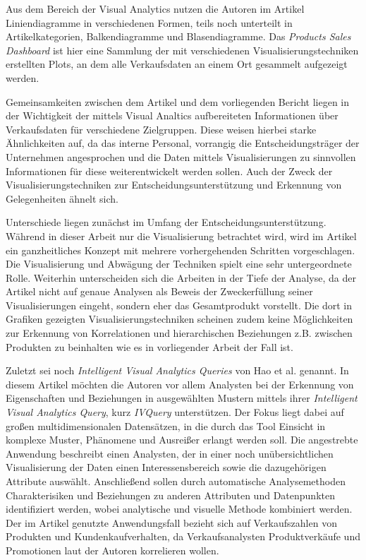 \documentclass[usegeometry=true]{scrartcl}
\begin{document}
Aus dem Bereich der Visual Analytics nutzen die Autoren im Artikel Liniendiagramme in verschiedenen Formen, teils noch unterteilt in Artikelkategorien, Balkendiagramme und Blasendiagramme.
Das \textit{Products Sales Dashboard} ist hier eine Sammlung der mit verschiedenen Visualisierungstechniken erstellten Plots, an dem alle Verkaufsdaten an einem Ort gesammelt aufgezeigt werden.

Gemeinsamkeiten zwischen dem Artikel und dem vorliegenden Bericht liegen in der Wichtigkeit der mittels Visual Analtics aufbereiteten Informationen über Verkaufsdaten für verschiedene Zielgruppen.
Diese weisen hierbei starke Ähnlichkeiten auf, da das interne Personal, vorrangig die Entscheidungsträger der Unternehmen angesprochen und die Daten mittels Visualisierungen zu sinnvollen Informationen für diese weiterentwickelt werden sollen.
Auch der Zweck der Visualisierungstechniken zur Entscheidungsunterstützung und Erkennung von Gelegenheiten ähnelt sich.

Unterschiede liegen zunächst im Umfang der Entscheidungsunterstützung. Während in dieser Arbeit nur die Visualisierung betrachtet wird, wird im Artikel ein ganzheitliches Konzept mit mehrere vorhergehenden Schritten vorgeschlagen. 
Die Visualisierung und Abwägung der Techniken spielt eine sehr untergeordnete Rolle.
Weiterhin unterscheiden sich die Arbeiten in der Tiefe der Analyse, da der Artikel nicht auf genaue Analysen als Beweis der Zweckerfüllung seiner Visualisierungen eingeht, sondern eher das Gesamtprodukt vorstellt.
Die dort in Grafiken gezeigten Visualisierungstechniken scheinen zudem keine Möglichkeiten zur Erkennung von Korrelationen und hierarchischen Beziehungen z.B. zwischen Produkten zu beinhalten wie es in vorliegender Arbeit der Fall ist.

Zuletzt sei noch \textit{Intelligent Visual Analytics Queries} von Hao et al. genannt.\cite{Hao.2007}
In diesem Artikel möchten die Autoren vor allem Analysten bei der Erkennung von Eigenschaften und Beziehungen in ausgewählten Mustern mittels ihrer \textit{Intelligent Visual Analytics Query}, kurz \textit{IVQuery} unterstützen.
Der Fokus liegt dabei auf großen multidimensionalen Datensätzen, in die durch das Tool Einsicht in komplexe Muster, Phänomene und Ausreißer erlangt werden soll.
Die angestrebte Anwendung beschreibt einen Analysten, der in einer noch unübersichtlichen Visualisierung der Daten einen Interessensbereich sowie die dazugehörigen Attribute auswählt.
Anschließend sollen durch automatische Analysemethoden Charakterisiken und Beziehungen zu anderen Attributen und Datenpunkten identifiziert werden, wobei analytische und visuelle Methode kombiniert werden.
Der im Artikel genutzte Anwendungsfall bezieht sich auf Verkaufszahlen von Produkten und Kundenkaufverhalten, da Verkaufsanalysten Produktverkäufe und Promotionen laut der Autoren korrelieren wollen. 
\end{document}
